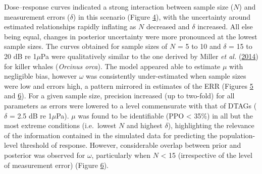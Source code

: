 \documentclass[
]{article}
\begin{document}
Dose--response curves indicated a strong interaction between sample size (\(N\)) and measurement errors (\(\delta\)) in this scenario (Figure \hyperlink{fig4}{4}), with the uncertainty around estimated relationships rapidly inflating as \(N\) decreased and \(\delta\) increased. All else being equal, changes in posterior uncertainty were more pronounced at the lowest sample sizes. The curves obtained for sample sizes of \(N\) = 5 to 10 and \(\delta\) = 15 to 20 dB re 1\(\mu\)Pa were qualitatively similar to the one derived by Miller \emph{et al.} (\protect\hyperlink{ref-Miller2014}{2014}) for killer whales (\emph{Orcinus orca}). The model appeared able to estimate \(\mu\) with negligible bias, however \(\omega\) was consistently under-estimated when sample sizes were low and errors high, a pattern mirrored in estimates of the ERR (Figures \hyperlink{fig5}{5} and \hyperlink{fig6}{6}). For a given sample size, precision increased (up to two-fold) for all parameters as errors were lowered to a level commensurate with that of DTAGs (\(\delta\) = 2.5 dB re 1\(\mu\)Pa). \(\mu\) was found to be identifiable (PPO \textless{} 35\%) in all but the most extreme conditions (i.e.~lowest \(N\) and highest \(\delta\)), highlighting the relevance of the information contained in the simulated data for predicting the population-level threshold of response. However, considerable overlap between prior and posterior was observed for \(\omega\), particularly when \(N\) \textless{} 15 (irrespective of the level of measurement error) (Figure \hyperlink{fig6}{6}).
\end{document}
